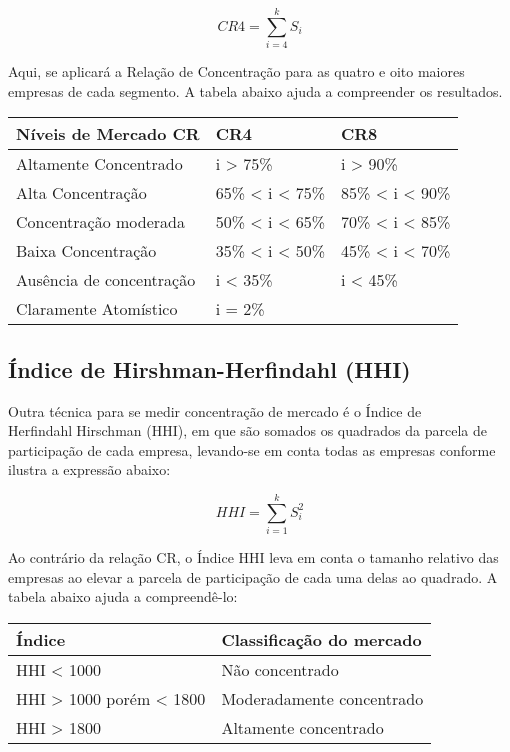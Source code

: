 \documentclass[
]{article}
\begin{document}
\[CR4 = \sum_{i = 4}^{k}{S_{i}} \]

Aqui, se aplicará a Relação de Concentração para as quatro e oito
maiores empresas de cada segmento. A tabela abaixo ajuda a compreender
os resultados.

\begin{longtable}[]{@{}lll@{}}
\toprule()
\textbf{Níveis de Mercado CR} & CR4 & CR8 \\
\midrule()
\endhead
Altamente Concentrado & i \textgreater{} 75\% & i \textgreater{} 90\% \\
Alta Concentração & 65\% \textless{} i \textless{} 75\% & 85\%
\textless{} i \textless{} 90\% \\
Concentração moderada & 50\% \textless{} i \textless{} 65\% & 70\%
\textless{} i \textless{} 85\% \\
Baixa Concentração & 35\% \textless{} i \textless{} 50\% & 45\%
\textless{} i \textless{} 70\% \\
Ausência de concentração & i \textless{} 35\% & i \textless{} 45\% \\
Claramente Atomístico & i = 2\% & \\
\bottomrule()
\end{longtable}

\hypertarget{uxedndice-de-hirshman-herfindahl-hhi}{%
\subsection{Índice de Hirshman-Herfindahl
(HHI)}\label{uxedndice-de-hirshman-herfindahl-hhi}}

Outra técnica para se medir concentração de mercado é o Índice de
HerfindahlHirschman (HHI), em que são somados os quadrados da parcela de
participação de cada empresa, levando-se em conta todas as empresas
conforme ilustra a expressão abaixo:

\[HHI = \sum_{i = 1}^{k}{S_{i}^2} \]

Ao contrário da relação CR, o Índice HHI leva em conta o tamanho
relativo das empresas ao elevar a parcela de participação de cada uma
delas ao quadrado. A tabela abaixo ajuda a compreendê-lo:

\begin{longtable}[]{@{}ll@{}}
\toprule()
Índice & Classificação do mercado \\
\midrule()
\endhead
HHI \textless{} 1000 & Não concentrado \\
HHI \textgreater{} 1000 porém \textless{} 1800 & Moderadamente
concentrado \\
HHI \textgreater{} 1800 & Altamente concentrado \\
\bottomrule()
\end{longtable}
\end{document}
